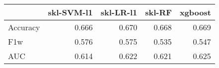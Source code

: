 \begin{tabular}{lrrrr}
\toprule
{} &  skl-SVM-l1 &  skl-LR-l1 &  skl-RF &  xgboost \\
\midrule
Accuracy &       0.666 &      0.670 &   0.668 &    0.669 \\
F1w      &       0.576 &      0.575 &   0.535 &    0.547 \\
AUC      &       0.614 &      0.622 &   0.621 &    0.625 \\
\bottomrule
\end{tabular}
